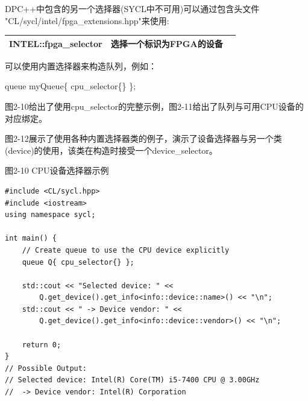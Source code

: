 \hspace*{\fill} \par %
DPC++中包含的另一个选择器(SYCL中不可用)可以通过包含头文件\\
"CL/sycl/intel/fpga\_extensions.hpp"来使用:

\hspace*{\fill} \par %
\begin{tabular}{lp{10cm}p{10cm}}
	\toprule  %
	\textbf{INTEL::fpga\_selector} & 选择一个标识为FPGA的设备\\
	\bottomrule %
\end{tabular}

\hspace*{\fill} \par %
可以使用内置选择器来构造队列，例如：\par

\begin{tcolorbox}[colback=green!5!white,colframe=green!75!black]
queue myQueue\{ cpu\_selector\{\} \};
\end{tcolorbox}

图2-10给出了使用cpu\_selector的完整示例，图2-11给出了队列与可用CPU设备的对应绑定。\par

图2-12展示了使用各种内置选择器类的例子，演示了设备选择器与另一个类(device)的使用，该类在构造时接受一个device\_selector。\par

\hspace*{\fill} \par %
图2-10 CPU设备选择器示例
\begin{lstlisting}[caption={}]
#include <CL/sycl.hpp>
#include <iostream>
using namespace sycl;

int main() {
	// Create queue to use the CPU device explicitly
	queue Q{ cpu_selector{} };
	
	std::cout << "Selected device: " <<
		Q.get_device().get_info<info::device::name>() << "\n";
	std::cout << " -> Device vendor: " <<
		Q.get_device().get_info<info::device::vendor>() << "\n";
		
	return 0;
}
// Possible Output:
// Selected device: Intel(R) Core(TM) i5-7400 CPU @ 3.00GHz
//  -> Device vendor: Intel(R) Corporation
\end{lstlisting}

